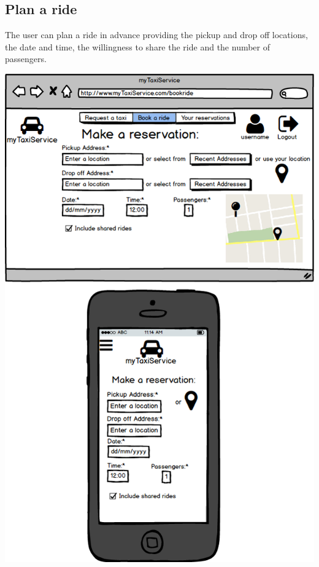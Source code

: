 \documentclass[a4paper,11pt]{report} %
\begin{document}
	\subsection{Plan a ride} The user can plan a ride in advance providing the pickup and drop off locations, the date and time, the willingness to share the ride and the number of passengers.
	\begin{center}
		\includegraphics[width=0.9\linewidth]{Pictures/PlanAndBookARide}
	\end{center}
	\pagebreak
	
\end{document}
